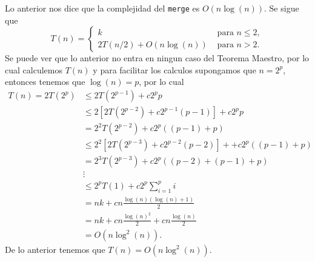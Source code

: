 \documentclass[12pt]{article}
\begin{document}
    Lo anterior nos dice que la complejidad del \verb|merge| es $O(n\log(n))$.
    Se sigue que 
    \[
        T(n) = \begin{cases}
            k & \text{ para }n \le 2,\\
            2T(n/2) + O(n\log(n)) & \text{ para } n>2.
        \end{cases}
    \]
    Se puede ver que lo anterior no entra en ningun caso del Teorema Maestro, por lo cual calculemos 
    $T(n)$ y para facilitar los calculos supongamos que $n=2^p$, entonces tenemos que $\log(n) = p$, 
    por lo cual 
    \begin{align*}
        T(n) = 2T(2^p) &\le 2T(2^{p-1}) + c 2^{p}p \\
             &\le 2\left[ 2T(2^{p-2}) + c 2^{p-1}(p-1)\right] + c 2^{p}p \\
             &= 2^2T(2^{p-2}) + c2^p((p-1) + p)\\
             &\le 2^2\left[ 2T(2^{p-3}) + c 2^{p-2}(p-2)\right] + + c2^p((p-1) + p)\\
             &= 2^3T(2^{p-3}) + c2^p \left( (p-2) + (p-1) + p\right) \\
             &\vdots\\
             &\le 2^pT(1) + c2^p\sum_{i=1}^{p} i \\
             &= nk + c n \frac{\log(n)(\log(n) + 1)}{2} \\
             &= nk + cn\frac{\log(n)^2}{2} + cn\frac{\log(n)}{2}\\
             &= O(n\log^2(n)).
    \end{align*}
    De lo anterior tenemos que $T(n) = O(n\log^2(n))$.
\end{document}
